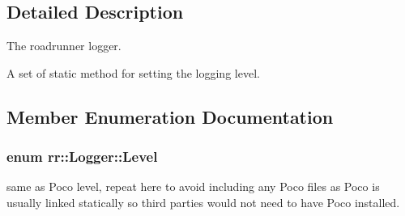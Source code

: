 \subsection{Detailed Description}
The roadrunner logger.

A set of static method for setting the logging level. 

\subsection{Member Enumeration Documentation}
\hypertarget{classrr_1_1_logger_a72a52e7fe7be48e2ecad639c641ee8aa}{
\subsubsection[{Level}]{\setlength{\rightskip}{0pt plus 5cm}enum {\bf rr\-::\-Logger\-::\-Level}}}\label{classrr_1_1_logger_a72a52e7fe7be48e2ecad639c641ee8aa}
same as Poco level, repeat here to avoid including any Poco files as Poco is usually linked statically so third parties would not need to have Poco installed.

